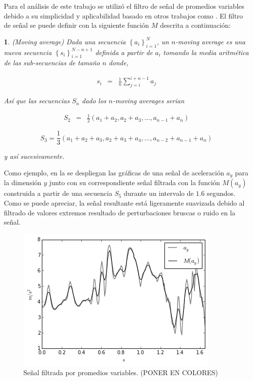 Para el análisis de este trabajo se utilizó el filtro de señal de
promedios variables debido a su simplicidad y aplicabilidad basado
en otros trabajos como \cite{Yang2009}. El filtro de señal se puede
definir con la siguiente función $M$ descrita a continuación:

\label{def4:moving-average}\newtheorem{defs}{ }

\begin{defs}(\emph{Moving average}) Dada una secuencia $\left\{ a_{i}\right\} _{i=1}^{N}$,
un $n$-\emph{moving average} es una nueva secuencia $\left\{ s_{i}\right\} _{i=1}^{N-n+1}$
definida a partir de $a_{i}$ tomando la media aritmética de las \emph{sub}-secuencias
de tamaño $n$ donde,

\begin{eqnarray}
s_{i} & = & \frac{1}{n}\sum_{j=i}^{i+n-1}a_{j}
\end{eqnarray}

Así que las secuencias $S_{n}$ dado los $n$-\emph{moving averages}
serian 

\begin{eqnarray}
S_{2} & = & \frac{1}{2}(a_{1}+a_{2},a_{2}+a_{3},...,a_{n-1}+a_{n})
\end{eqnarray}

\begin{equation}
S_{3}=\frac{1}{3}(a_{1}+a_{2}+a_{3},a_{2}+a_{3}+a_{4},...,a_{n-2}+a_{n-1}+a_{n})
\end{equation}

y así sucesivamente.\end{defs}

Como ejemplo, en la  se despliegan las gráficas
de una señal de aceleración $a_{y}$ para la dimensión \textbf{$y$}
junto con su correspondiente señal filtrada con la función $M(a_{y})$
construida a partir de una secuencia $S_{5}$ durante un intervalo
de $1.6$ segundos. Como se puede apreciar, la señal resultante está
ligeramente suavizada debido al filtrado de valores extremos resultado
de perturbaciones bruscas o ruido en la señal.

\begin{figure}[!tbph]
\begin{centering}
\includegraphics{capitulo-4/graphics/moving_average}
\par\end{centering}
\caption[Señal filtrada por la función $M$]{\label{fig4:filter-maf}Señal filtrada por promedios variables. (PONER
EN COLORES)}
\end{figure}



